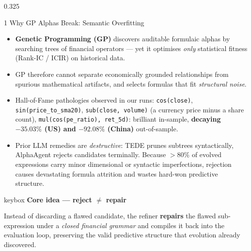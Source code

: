 \documentclass[final]{beamer}
\newenvironment{keybox}[1]{%
  \par\vskip0.32cm\noindent%
  \begin{beamercolorbox}[wd=\linewidth,leftskip=0.35cm,rightskip=0.35cm,sep=0.3cm]{keybox}%
  \textbf{\color{accent2}#1}\par\vskip0.12cm%
}{%
  \end{beamercolorbox}\vskip0.22cm\par%
}
\newcommand{\hl}[1]{\textbf{\color{navy2}#1}}
\newcommand{\bd}[1]{\textbf{\color{bad}#1}}
\newcommand{\code}[1]{\texttt{#1}}
\begin{document}
\begin{frame}[t]{}
\vskip0.45cm
\begin{columns}[t]
\begin{column}{0.325\textwidth}

\begin{block}{1 \; Why GP Alphas Break: Semantic Overfitting}
\begin{itemize}
  \item \hl{Genetic Programming (GP)} discovers auditable formulaic alphas by searching trees of financial operators --- yet it optimises \emph{only} statistical fitness (Rank-IC / ICIR) on historical data.
  \item GP therefore cannot separate economically grounded relationships from spurious mathematical artifacts, and selects formulas that fit \emph{structural noise}.
  \item Hall-of-Fame pathologies observed in our runs: \code{cos(close)}, \code{sin(price\_to\_sma20)}, \code{sub(close, volume)} (a currency price minus a share count), \code{mul(cos(pe\_ratio), ret\_5d)}: brilliant in-sample, \bd{decaying $-35.03\%$ (US) and $-92.08\%$ (China)} out-of-sample.
  \item Prior LLM remedies are \emph{destructive}: TEDE prunes subtrees syntactically, AlphaAgent rejects candidates terminally. Because \hl{$>80\%$} of evolved expressions carry minor dimensional or syntactic imperfections, rejection causes devastating formula attrition and wastes hard-won predictive structure.
\end{itemize}
\begin{keybox}{Core idea --- reject $\neq$ repair}
Instead of discarding a flawed candidate, the refiner \textbf{repairs} the flawed sub-expression under a \emph{closed financial grammar} and compiles it back into the evaluation loop, preserving the valid predictive structure that evolution already discovered.
\end{keybox}
\end{block}


\end{column}
\end{columns}
\end{frame}
\end{document}
